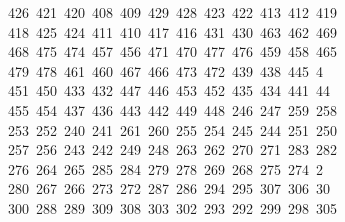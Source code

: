 \begin{tabbing}
\ 426\ 421\ 420\ 408\ 409\ 429\ 428\ 423\ 422\ 413\ 412\ 419\\[0pt]
\>\ 418\ 425\ 424\ 411\ 410\ 417\ 416\ 431\ 430\ 463\ 462\ 469\\[0pt]
\>\ 468\ 475\ 474\ 457\ 456\ 471\ 470\ 477\ 476\ 459\ 458\ 465\ \\[0pt]
\ 479\ 478\ 461\ 460\ 467\ 466\ 473\ 472\ 439\ 438\ 445\ 4\\[0pt]
\ 451\ 450\ 433\ 432\ 447\ 446\ 453\ 452\ 435\ 434\ 441\ 44\\[0pt]
\ 455\ 454\ 437\ 436\ 443\ 442\ 449\ 448\ 246\ 247\ 259\ 258\\[0pt]
\>\ 253\ 252\ 240\ 241\ 261\ 260\ 255\ 254\ 245\ 244\ 251\ 250\\[0pt]
\>\ 257\ 256\ 243\ 242\ 249\ 248\ 263\ 262\ 270\ 271\ 283\ 282\ \\[0pt]
\ 276\ 264\ 265\ 285\ 284\ 279\ 278\ 269\ 268\ 275\ 274\ 2\\[0pt]
\ 280\ 267\ 266\ 273\ 272\ 287\ 286\ 294\ 295\ 307\ 306\ 30\\[0pt]
\ 300\ 288\ 289\ 309\ 308\ 303\ 302\ 293\ 292\ 299\ 298\ 305\\[0pt]

\end{tabbing}
